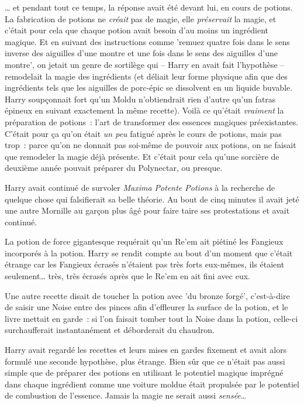 … et pendant tout ce temps, la réponse avait été devant lui, en cours de potions. La fabrication de potions ne \emph{créait} pas de magie, elle \emph{préservait} la magie, et c'était pour cela que chaque potion avait besoin d'au moins un ingrédient magique. Et en suivant des instructions comme 'remuez quatre fois dans le sens inverse des aiguilles d'une montre et une fois dans le sens des aiguilles d'une montre', on jetait un genre de sortilège qui -- Harry en avait fait l'hypothèse -- remodelait la magie des ingrédients (et déliait leur forme physique afin que des ingrédients tels que les aiguilles de porc-épic se dissolvent en un liquide buvable. Harry soupçonnait fort qu'un Moldu n'obtiendrait rien d'autre qu'un fatras épineux en suivant exactement la même recette). Voilà ce qu'était \emph{vraiment} la préparation de potions~: l'art de transformer des essences magiques préexistantes. C'était pour ça qu'on était \emph{un peu} fatigué après le cours de potions, mais pas trop~: parce qu'on ne donnait pas soi-même de pouvoir aux potions, on ne faisait que remodeler la magie déjà présente. Et c'était pour cela qu'une sorcière de deuxième année pouvait préparer du Polynectar, ou presque.

Harry avait continué de survoler \emph{Maxima Potente Potions} à la recherche de quelque chose qui falsifierait sa belle théorie. Au bout de cinq minutes il avait jeté une autre Mornille au garçon plus âgé pour faire taire ses protestations et avait continué.

La potion de force gigantesque requérait qu'un Re'em ait piétiné les Fangieux incorporés à la potion. Harry se rendit compte au bout d'un moment que c'était étrange car les Fangieux écrasés n'étaient pas très forts eux-mêmes, ils étaient seulement… très, très écrasés après que le Re'em en ait fini avec eux.

Une autre recette disait de toucher la potion avec 'du bronze forgé', c'est-à-dire de saisir une Noise entre des pinces afin d'effleurer la surface de la potion, et le livre mettait en garde~: si l'on faisait tomber tout la Noise dans la potion, celle-ci surchaufferait instantanément et déborderait du chaudron.

Harry avait regardé les recettes et leurs mises en gardes fixement et avait alors formulé une seconde hypothèse, plus étrange. Bien sûr que ce n'était pas aussi simple que de préparer des potions en utilisant le potentiel magique imprégné dans chaque ingrédient comme une voiture moldue était propulsée par le potentiel de combustion de l'essence. Jamais la magie ne serait aussi \emph{sensée}…

